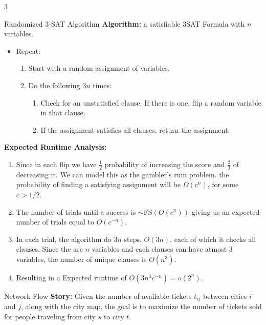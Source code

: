 \documentclass[10pt,a4paper]{article}
\begin{document}
\begin{multicols}{3}
\begin{textbox}{Randomized 3-SAT Algorithm}
    {\bf Algorithm:}  a satisfiable 3SAT Formula with $n$ variables.
    \begin{itemize}
        \item Repeat:
    \begin{enumerate}
        \item Start with a random assignment of variables.
        \item Do the following $3n$ times:
        \begin{enumerate}
            \item Check for an unstatisfied clause. If there is one, flip a random variable in that clause.
            \item If the assignment satisfies all clauses, return the assignment.
        \end{enumerate}
    \end{enumerate}
    \end{itemize}

    {\bf Expected Runtime Analysis:}
    \begin{enumerate}
        \item Since in each flip we have $\frac{1}{2}$ probability of increasing
        the score and $\frac{2}{3}$ of decreasing it. We can model this as the gambler's ruin problem. 
        the probability of finding a satisfying assignment will be $\Omega(c^n)$,
        for some $c > 1/2$.
        \item The number of trials until a success is $\sim \text{FS}(O(c^n))$ 
        giving us an expected number of trials equal to $O(c^{-n})$.
        \item In each trial, the algorithm do $3n$ steps, $O(3n)$, each of which 
        it checks all clauses. Since the are $n$ variables and each clauses can
        have atmost $3$ variables, the number of unique clauses is $O(n^3)$.
        \item Resulting in a Expected runtime of $O(3n^4 c^{-n}) = o(2^{n})$.
        
    \end{enumerate}
\end{textbox}

\begin{textbox}{Network Flow}
    {\bf Story:} Given the number of available tickets $t_{ij}$ between cities 
    $i$ and $j$, along with the city map, the goal is to maximize the number of 
    tickets sold for people traveling from city $s$ to city $t$.


\end{textbox}
\end{multicols}
\end{document}
